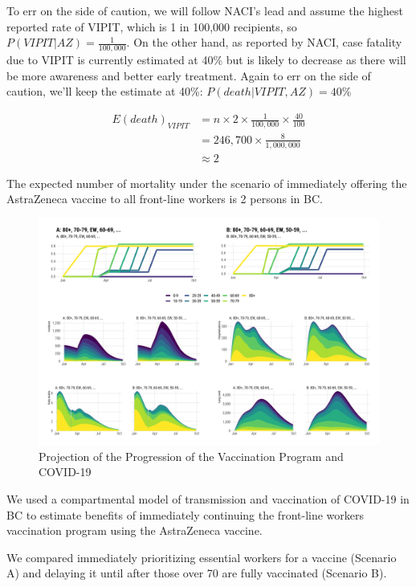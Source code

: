 \documentclass[]{interact}
\theoremstyle{plain}%
\theoremstyle{definition}
\theoremstyle{remark}
\begin{document}
To err on the side of caution, we will follow NACI's lead and assume the
highest reported rate of VIPIT, which is 1 in 100,000 recipients, so
\(P(VIPIT|AZ) = \frac{1}{100,000}\). On the other hand, as reported by
NACI, case fatality due to VIPIT is currently estimated at 40\% but is
likely to decrease as there will be more awareness and better early
treatment. Again to err on the side of caution, we'll keep the estimate
at 40\%: \(P(death|VIPIT, AZ)=40\%\)

\[
\begin{aligned}
E(death)_{VIPIT} & = n \times 2 \times \frac{1}{100,000} \times \frac{40}{100} \\
& = 246,700 \times \frac{8}{1,000,000} \\
& \approx 2  
\end{aligned}
\]

The expected number of mortality under the scenario of immediately
offering the AstraZeneca vaccine to all front-line workers is 2 persons
in BC.

\begin{figure}

{\centering \includegraphics[width=1\linewidth]{../figures/fig-trajectoriesFull} 

}

\caption{Projection of the Progression of the Vaccination Program and COVID-19}\label{fig:fig1}
\end{figure}

We used a compartmental model of transmission and vaccination of
COVID-19 in BC to estimate benefits of immediately continuing the
front-line workers vaccination program using the AstraZeneca vaccine.

We compared immediately prioritizing essential workers for a vaccine
(Scenario A) and delaying it until after those over 70 are fully
vaccinated (Scenario B).
\end{document}
